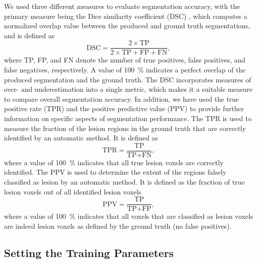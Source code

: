 We used three different measures to evaluate segmentation accuracy, with the
primary measure being the Dice similarity coefficient (DSC)
\cite{dice1945measures}, which computes a normalized overlap value between the
produced and ground truth segmentations, and is defined as
\begin{equation}
\text{DSC} = \frac{2 \times \text{TP}}{2 \times \text{TP} + \text{FP} +
\text{FN}},
\end{equation}
where TP, FP, and FN denote the number of true positives, false positives, and
false negatives, respectively. A value of \SI{100}{\percent} indicates a perfect
overlap of the produced segmentation and the ground truth.
The DSC incorporates measures of over- and underestimation into a single
metric, which makes it a suitable measure to compare overall segmentation
accuracy.
In addition, we have used the true positive rate (TPR) and the positive
predictive value (PPV) to provide further information on specific aspects of
segmentation performance. The TPR is used to measure the fraction of the lesion
regions in the ground truth that are correctly identified by
an automatic method. It is defined as
\begin{equation}
\text{TPR} = \frac{\text{TP}}{\text{TP} + \text{FN}},
\end{equation}
where a value of \SI{100}{\percent} indicates that all true lesion voxels are
correctly identified. The PPV is used to determine the extent of the regions
falsely classified as lesion by an automatic method. It is defined as the
fraction of true lesion voxels out of all identified lesion voxels
\begin{equation}
\text{PPV} = \frac{\text{TP}}{\text{TP} + \text{FP}},
\end{equation}
where a value of \SI{100}{\percent} indicates that all voxels that are
classified as lesion voxels are indeed lesion voxels as defined by the ground
truth (no false positives).

\subsection{Setting the Training Parameters}

